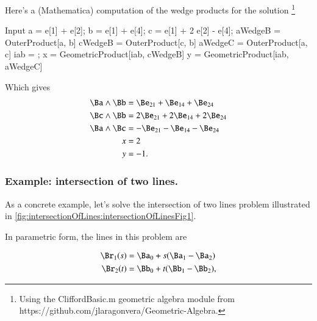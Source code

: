 Here's a (Mathematica) computation of the wedge products for the solution
\footnote{
Using the
CliffordBasic.m
geometric algebra module from
https://github.com/jlaragonvera/Geometric-Algebra.
}

\begin{mmaCell}[moredefined={a, b, c, iab, aWedgeB, cWedgeB, aWedgeC, x, y, e, OuterProduct, GeometricProduct}]{Input}
a = e[1] + e[2];
b = e[1] + e[4];
c = e[1] + 2 e[2] - e[4];
aWedgeB = OuterProduct[a, b]
cWedgeB = OuterProduct[c, b]
aWedgeC = OuterProduct[a, c]
iab = ;
x = GeometricProduct[iab, cWedgeB]
y = GeometricProduct[iab, aWedgeC]
\end{mmaCell}

Which gives
\begin{dmath}\label{eqn:solutionOfLinearSystem:1300}
\begin{aligned}
\Ba \wedge \Bb &= \Be_{21} + \Be_{14} + \Be_{24} \\
\Bc \wedge \Bb &= 2 \Be_{21} + 2 \Be_{14} + 2 \Be_{24} \\
\Ba \wedge \Bc &= -\Be_{21} - \Be_{14} - \Be_{24} \\
x &= 2 \\
y &= -1.
\end{aligned}
\end{dmath}

\subsubsection{Example: intersection of two lines.}

As a concrete example, let's solve the intersection of two lines problem illustrated in \cref{fig:intersectionOfLines:intersectionOfLinesFig1}.


In parametric form, the lines in this problem are

\begin{dmath}\label{eqn:solutionOfLinearSystem:1000}
\begin{aligned}
\Br_1(s) &= \Ba_0 + s( \Ba_1 - \Ba_2 ) \\
\Br_2(t) &= \Bb_0 + t( \Bb_1 - \Bb_2 ),
\end{aligned}
\end{dmath}


